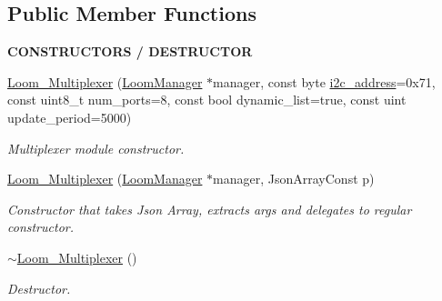 \subsection*{Public Member Functions}
\begin{Indent}{\bf C\+O\+N\+S\+T\+R\+U\+C\+T\+O\+RS / D\+E\+S\+T\+R\+U\+C\+T\+OR}\par
\begin{DoxyCompactItemize}
\item 
\hyperlink{class_loom___multiplexer_a4409df6598098393b5fa3b3012735d55}{Loom\+\_\+\+Multiplexer} (\hyperlink{class_loom_manager}{Loom\+Manager} $\ast$manager, const byte \hyperlink{class_loom___multiplexer_af382145cee4e802bbf431e799983423b}{i2c\+\_\+address}=0x71, const uint8\+\_\+t num\+\_\+ports=8, const bool dynamic\+\_\+list=true, const uint update\+\_\+period=5000)
\begin{DoxyCompactList}\small\item\em Multiplexer module constructor. \end{DoxyCompactList}\item 
\hyperlink{class_loom___multiplexer_a28e8d5e652d1be8553d0f283ce1c9e38}{Loom\+\_\+\+Multiplexer} (\hyperlink{class_loom_manager}{Loom\+Manager} $\ast$manager, Json\+Array\+Const p)
\begin{DoxyCompactList}\small\item\em Constructor that takes Json Array, extracts args and delegates to regular constructor. \end{DoxyCompactList}\item 
\hyperlink{class_loom___multiplexer_a5db8b4a6043b42b792f6230f96374ef4}{$\sim$\+Loom\+\_\+\+Multiplexer} ()
\begin{DoxyCompactList}\small\item\em Destructor. \end{DoxyCompactList}\end{DoxyCompactItemize}
\end{Indent}
